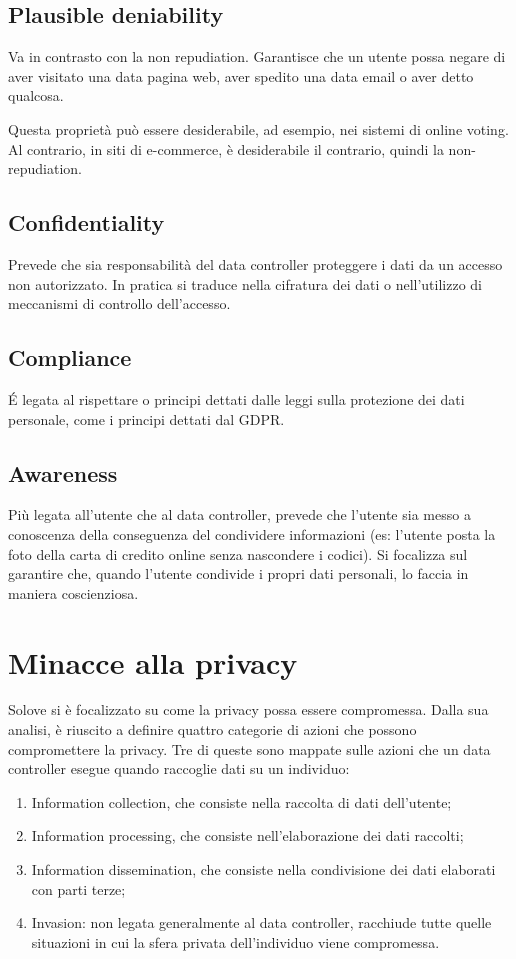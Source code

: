 \subsection{Plausible deniability}
Va in contrasto con la non repudiation. Garantisce che un utente possa negare di aver visitato una data pagina web, aver spedito una data email o aver detto qualcosa. 

Questa proprietà può essere desiderabile, ad esempio, nei sistemi di online voting. Al contrario, in siti di e-commerce, è desiderabile il contrario, quindi la non-repudiation.

\subsection{Confidentiality}
Prevede che sia responsabilità del data controller proteggere i dati da un accesso non autorizzato. In pratica si traduce nella cifratura dei dati o nell'utilizzo di meccanismi di controllo dell'accesso.

\subsection{Compliance}
É legata al rispettare o principi dettati dalle leggi sulla protezione dei dati personale, come i principi dettati dal GDPR.

\subsection{Awareness}
Più legata all'utente che al data controller, prevede che l'utente sia messo a conoscenza della conseguenza del condividere informazioni (es: l'utente posta la foto della carta di credito online senza nascondere i codici). Si focalizza sul garantire che, quando l'utente condivide i propri dati personali, lo faccia in maniera coscienziosa. 

\section{Minacce alla privacy}
Solove si è focalizzato su come la privacy possa essere compromessa. Dalla sua analisi, è riuscito a definire quattro categorie di azioni che possono compromettere la privacy. Tre di queste sono mappate sulle azioni che un data controller esegue quando raccoglie dati su un individuo:
\begin{enumerate}
    \item Information collection, che consiste nella raccolta di dati dell'utente;
    \item Information processing, che consiste nell'elaborazione dei dati raccolti;
    \item Information dissemination, che consiste nella condivisione dei dati elaborati con parti terze;
    \item Invasion: non legata generalmente al data controller, racchiude tutte quelle situazioni in cui la sfera privata dell'individuo viene compromessa.
\end{enumerate}


